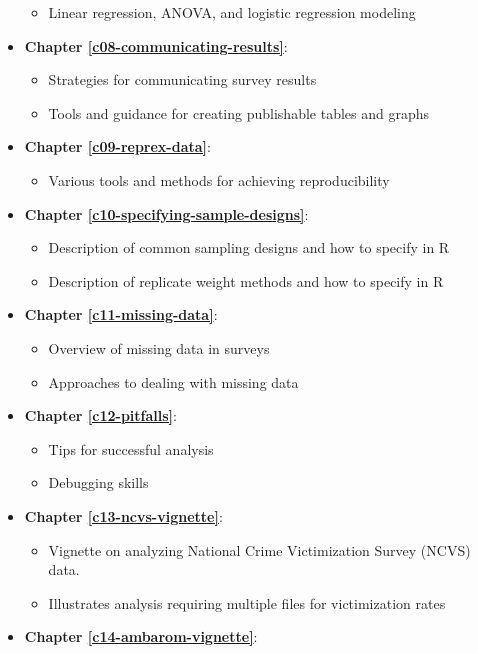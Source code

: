 \documentclass[
]{krantz}
\providecommand{\tightlist}{%
  \setlength{\itemsep}{0pt}\setlength{\parskip}{0pt}}
\begin{document}
\begin{itemize}
  \begin{itemize}
  \tightlist
  \item
    Linear regression, ANOVA, and logistic regression modeling
  \end{itemize}
\item
  \textbf{Chapter \ref{c08-communicating-results}}:

  \begin{itemize}
  \tightlist
  \item
    Strategies for communicating survey results
  \item
    Tools and guidance for creating publishable tables and graphs
  \end{itemize}
\item
  \textbf{Chapter \ref{c09-reprex-data}}:

  \begin{itemize}
  \tightlist
  \item
    Various tools and methods for achieving reproducibility
  \end{itemize}
\item
  \textbf{Chapter \ref{c10-specifying-sample-designs}}:

  \begin{itemize}
  \tightlist
  \item
    Description of common sampling designs and how to specify in R
  \item
    Description of replicate weight methods and how to specify in R
  \end{itemize}
\item
  \textbf{Chapter \ref{c11-missing-data}}:

  \begin{itemize}
  \tightlist
  \item
    Overview of missing data in surveys
  \item
    Approaches to dealing with missing data
  \end{itemize}
\item
  \textbf{Chapter \ref{c12-pitfalls}}:

  \begin{itemize}
  \tightlist
  \item
    Tips for successful analysis
  \item
    Debugging skills
  \end{itemize}
\item
  \textbf{Chapter \ref{c13-ncvs-vignette}}:

  \begin{itemize}
  \tightlist
  \item
    Vignette on analyzing National Crime Victimization Survey (NCVS) data.
  \item
    Illustrates analysis requiring multiple files for victimization rates
  \end{itemize}
\item
  \textbf{Chapter \ref{c14-ambarom-vignette}}:


\end{itemize}
\end{document}
